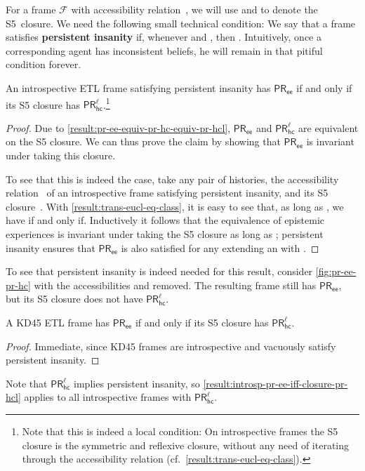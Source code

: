 \documentclass{article}
\newcommand{\PRhcl}{\ensuremath{\mathsf{PR_{hc}^\ell}}\xspace}
\newcommand{\PRee}{\ensuremath{\mathsf{PR_{ee}}}\xspace}
\def\dfn{\textbf}
\def\dfnless{\dfn} \def\F{\ensuremath{\mathcal{F}}\xspace}
\newcommand{\tiff}{if and only if\xspace}
\newcounter{#1}
\begin{document}
For a frame \F with accessibility relation~, we will use  and  to denote the S5~closure.
We need the following small technical condition:
We say that a frame satisfies \dfnless{persistent insanity}
if, whenever  and , then .
Intuitively, once a corresponding agent has inconsistent beliefs,
he will remain in that pitiful condition forever.

\begin{proposition}
  \label{result:introsp-pr-ee-iff-closure-pr-hcl}
  An introspective ETL frame satisfying persistent insanity has \PRee \tiff its S5 closure has \PRhcl.\footnote{\label{fn:s5-closure-is-local}
    Note that this is indeed a local condition:
    On introspective frames the S5 closure is the symmetric and reflexive closure,
    without any need of iterating through the accessibility relation (cf.~\cref{result:trans-eucl-eq-class}).}
\end{proposition}
\begin{proof}
  Due to \cref{result:pr-ee-equiv-pr-hc-equiv-pr-hcl},
  \PRee and \PRhcl are equivalent on the S5 closure.
  We can thus prove the claim by showing that
  \PRee is invariant under taking this closure.

  To see that this is indeed the case, take any pair  of histories,
  the accessibility relation~ of an introspective frame satisfying persistent insanity,
  and its S5 closure~.
  With \cref{result:trans-eucl-eq-class}, it is easy to see that,
  as long as , we have
   \tiff .
  Inductively it follows that the equivalence of epistemic experiences
  is invariant under taking the S5 closure as long as ;
  persistent insanity ensures that \PRee is also satisfied for any 
  extending an  with .
\end{proof}

To see that persistent insanity is indeed needed for this result,
consider \cref{fig:pr-ee-pr-hc}
with the accessibilities  and  removed.
The resulting frame still has \PRee, but its S5 closure does not have \PRhcl.

\begin{corollary}
  A KD45 ETL frame has \PRee \tiff its S5 closure has \PRhcl.
\end{corollary}
\begin{proof}
  Immediate, since KD45 frames are introspective and vacuously satisfy persistent insanity.
\end{proof}

\begin{numberedremark}
  \label{result:pr-hcl-implies-pers-ins}
  Note that \PRhcl implies persistent insanity,
  so \cref{result:introsp-pr-ee-iff-closure-pr-hcl} applies to all introspective frames with \PRhcl.
\end{numberedremark}
\end{document}
